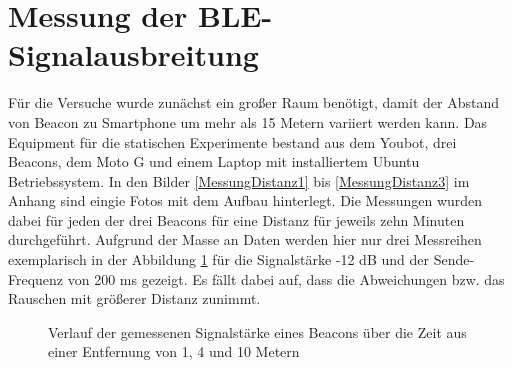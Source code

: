 \section{Messung der BLE-Signalausbreitung}\label{sec:MessungBLE}
Für die Versuche wurde zunächst ein großer Raum benötigt, damit der Abstand von Beacon zu Smartphone um mehr als 15 Metern variiert werden kann. Das Equipment für die statischen Experimente bestand aus dem Youbot, drei Beacons, dem Moto G und einem Laptop mit installiertem Ubuntu Betriebssystem. In den Bilder \ref{MessungDistanz1} bis \ref{MessungDistanz3} im Anhang sind eingie Fotos mit dem Aufbau hinterlegt. Die Messungen wurden dabei für jeden der drei Beacons für eine Distanz für jeweils zehn Minuten durchgeführt. Aufgrund der Masse an Daten werden hier nur drei Messreihen exemplarisch in der Abbildung \ref{fig:MeterNormal} für die Signalstärke -12 dB und der Sende-Frequenz von 200 ms gezeigt. Es fällt dabei auf, dass die Abweichungen bzw. das Rauschen mit größerer Distanz zunimmt. 
\begin{figure}[H] 
\centering
{}
\caption{Verlauf der gemessenen Signalstärke eines Beacons über die Zeit aus einer Entfernung von 1, 4 und 10 Metern}
\label{fig:MeterNormal}
\end{figure}
